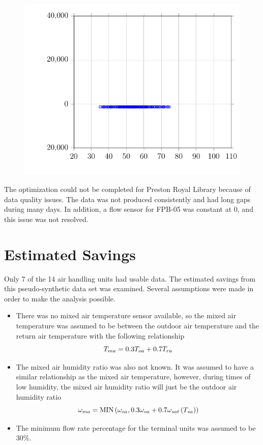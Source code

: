 \begin{figure}
\centering
\includegraphics{Plots/43-PrestonRoyalFPB-12-ZoneLoad/2017-08-07-0928-BtuhrvsOADryBulbTemperatureNOAAF.pdf}
\caption{}
\label{fig:2017-08-07-0928-BtuhrvsOADryBulbTemperatureNOAAF12}
\end{figure}




The optimization could not be completed for Preston Royal Library
because of data quality issues. The data was not produced consistently
and had long gaps during many days. In addition, a flow sensor for
FPB-05 was constant at 0, and this issue was not resolved. 

\section{Estimated Savings}

Only 7 of the 14 air handling units had usable data. The estimated
savings from this pseudo-synthetic data set was examined. Several
assumptions were made in order to make the analysis possible. 

\begin{itemize}
    \item There was no mixed air temperature sensor available, so the
        mixed air temperature was assumed to be between the outdoor air
        temperature and the return air temperature with the following
        relationship
\begin{equation}
T_{ma}{} = 0.3 T_{oa}{} + 0.7 T_{ra}{}
\end{equation}
\item The mixed air humidity ratio was also not known. It was assumed to
    have a similar relationship as the mixed air temperature, however,
    during times of low humidity, the mixed air humidity ratio will just
    be the outdoor air humidity ratio
\begin{equation}
    \omega_{ma} = \text{MIN}\left(\omega_{oa}, 0.3 \omega_{oa} + 0.7
    \omega_{sat}\left(T_{sa}{}\right) \right)
\end{equation}
\item The minimum flow rate percentage for the terminal units was
    assumed to be 30\%. 
\end{itemize}

